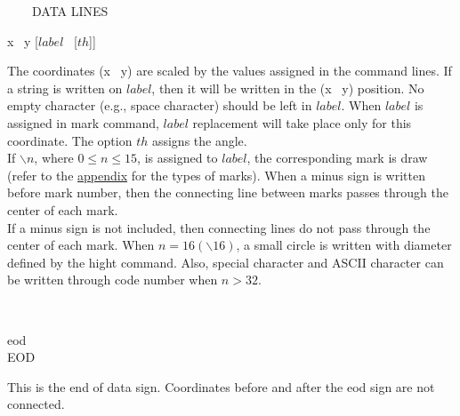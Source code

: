 \begin{qsection}{\ ~~~DATA LINES}
\begin{minipage}[t]{5.5cm}
 x ~y [$label$~ [$th$]]
\end{minipage}
\begin{minipage}[t]{9cm}
The coordinates (x ~y) are scaled by the values assigned in the
command lines.
If a string is written on $label$, then it will be written
in the (x ~y) position.
No empty character (e.g., space character) should be left in $label$.
When $label$ is assigned in mark command,
$label$ replacement will take place only for this coordinate.
The option $th$ assigns the angle.\\
If $\backslash n$, where $0 \leq n \leq 15$, is assigned to $label$,
the corresponding mark is draw (refer to the \hyperlink{lmark}{appendix} for the types of
marks).
When a minus sign is written before mark number,
then the connecting line between marks passes through the center of
each mark.\\
If a minus sign is not included, then connecting lines do not pass
through the center of each mark.
When $n=16(\backslash 16)$, a small circle is written with
diameter defined by the hight command.
Also, special character and ASCII character can be written through
code number when $n>32$.
\end{minipage}\\

\begin{minipage}[t]{5.5cm}
 eod\\
EOD
\end{minipage}
\begin{minipage}[t]{9cm}
This is the end of data sign.
Coordinates before and after the eod sign are not connected.
\end{minipage}
\end{qsection}
\newpage
